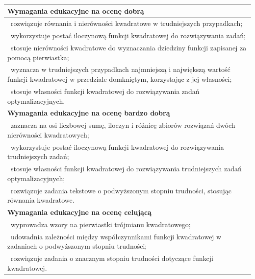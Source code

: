 \documentclass[12pt,a4paper]{article}
\begin{document}
\begin{longtable}{|p{16cm}|}
		\textbf{Wymagania edukacyjne na ocenę dobrą} \\ \hline
		
		\textbullet\ rozwiązuje równania i nierówności kwadratowe w trudniejszych przypadkach; \\
		
		\textbullet\ wykorzystuje postać iloczynową funkcji kwadratowej do rozwiązywania zadań; \\
		
		\textbullet\ stosuje nierówności kwadratowe do wyznaczania dziedziny funkcji zapisanej za pomocą pierwiastka; \\
		
		\textbullet\ wyznacza w trudniejszych przypadkach najmniejszą i największą wartość funkcji kwadratowej w przedziale domkniętym, korzystając z jej własności; \\
		
		\textbullet\ stosuje własności funkcji kwadratowej do rozwiązywania zadań optymalizacyjnych. \\ \hline
		
		\textbf{Wymagania edukacyjne na ocenę bardzo dobrą} \\ \hline
		
		\textbullet\ zaznacza na osi liczbowej sumę, iloczyn i różnicę zbiorów rozwiązań dwóch nierówności kwadratowych; \\
		
		\textbullet\ wykorzystuje postać iloczynową funkcji kwadratowej do rozwiązywania trudniejszych zadań; \\
		
		\textbullet\ stosuje własności funkcji kwadratowej do rozwiązywania trudniejszych zadań optymalizacyjnych; \\
		
		\textbullet\ rozwiązuje zadania tekstowe o podwyższonym stopniu trudności, stosując równania kwadratowe. \\ \hline
		
		\textbf{Wymagania edukacyjne na ocenę celującą} \\ \hline
		
		\textbullet\ wyprowadza wzory na pierwiastki trójmianu kwadratowego; \\
		
		\textbullet\ udowadnia zależności między współczynnikami funkcji kwadratowej w zadaniach o podwyższonym stopniu trudności; \\
		
		\textbullet\ rozwiązuje zadania o znacznym stopniu trudności dotyczące funkcji kwadratowej. \\ \hline
		
	\end{longtable}
	
\end{document}
